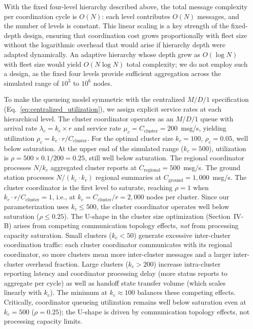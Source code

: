 \documentclass[journal]{IEEEtran}
\begin{document}
With the fixed four-level hierarchy described above, the total message complexity per coordination cycle is $O(N)$: each level contributes $O(N)$ messages, and the number of levels is constant. This linear scaling is a key strength of the fixed-depth design, ensuring that coordination cost grows proportionally with fleet size without the logarithmic overhead that would arise if hierarchy depth were adapted dynamically. An adaptive hierarchy whose depth grew as $O(\log N)$ with fleet size would yield $O(N \log N)$ total complexity; we do not employ such a design, as the fixed four levels provide sufficient aggregation across the simulated range of $10^3$ to $10^6$ nodes.

To make the queueing model symmetric with the centralized $M/D/1$ specification (Eq.~\ref{eq:centralized_utilization}), we assign explicit service rates at each hierarchical level. The cluster coordinator operates as an $M/D/1$ queue with arrival rate $\lambda_c = k_c \times r$ and service rate $\mu_c = C_{\text{cluster}} = 200$~msg/s, yielding utilization $\rho_c = k_c \cdot r / C_{\text{cluster}}$. For the optimal cluster size $k_c = 100$, $\rho_c = 0.05$, well below saturation. At the upper end of the simulated range ($k_c = 500$), utilization is $\rho = 500 \times 0.1 / 200 = 0.25$, still well below saturation. The regional coordinator processes $N/k_c$ aggregated cluster reports at $C_{\text{regional}} = 500$~msg/s. The ground station processes $N/(k_c \cdot k_r)$ regional summaries at $C_{\text{ground}} = 1{,}000$~msg/s. The cluster coordinator is the first level to saturate, reaching $\rho = 1$ when $k_c \cdot r / C_{\text{cluster}} = 1$, i.e., at $k_c = C_{\text{cluster}} / r = 2{,}000$ nodes per cluster. Since our parameterization uses $k_c \leq 500$, the cluster coordinator operates well below saturation ($\rho \leq 0.25$). The U-shape in the cluster size optimization (Section~IV-B) arises from competing communication topology effects, \emph{not} from processing capacity saturation. Small clusters ($k_c < 50$) generate excessive inter-cluster coordination traffic: each cluster coordinator communicates with its regional coordinator, so more clusters mean more inter-cluster messages and a larger inter-cluster overhead fraction. Large clusters ($k_c > 200$) increase intra-cluster reporting latency and coordinator processing delay (more status reports to aggregate per cycle) as well as handoff state transfer volume (which scales linearly with $k_c$). The minimum at $k_c \approx 100$ balances these competing effects. Critically, coordinator queueing utilization remains well below saturation even at $k_c = 500$ ($\rho = 0.25$); the U-shape is driven by communication topology effects, not processing capacity limits.
\end{document}
